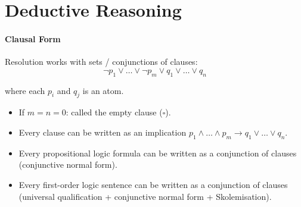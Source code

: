 \documentclass[twocolumn,english]{article}
\begin{document}
\section{Deductive Reasoning}

\paragraph{Clausal Form}

Resolution works with sets / conjunctions of clauses:
\[
\lnot p_{1}\lor\dots\lor\lnot p_{m}\lor q_{1}\lor\dots\lor q_{n}
\]

where each $p_{i}$ and $q_{j}$ is an atom.
\begin{itemize}
\item If $m=n=0$: called the empty clause ($\square$).
\item Every clause can be written as an implication $p_{1}\land\dots\land p_{m}\rightarrow q_{1}\lor\dots\lor q_{n}$.
\item Every propositional logic formula can be written as a conjunction
of clauses (conjunctive normal form).
\item Every first-order logic sentence can be written as a conjunction of
clauses (universal qualification + conjunctive normal form + Skolemisation).
\end{itemize}
\end{document}
